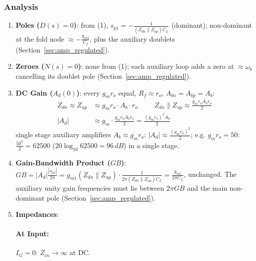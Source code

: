 \subsubsection{Analysis}
\begin{enumerate}
  \item \textbf{Poles (\(D(s) = 0\))}: from (1),
    \(s_{p1} = -\frac{1}{(Z_{dn} \parallel Z_{up}) C_L}\) (dominant); non-dominant at the fold node
    \(\approx -\frac{g_{m3}}{C_f}\), plus the auxiliary doublets (Section~\ref{sec:amp_regulated}).
  \item \textbf{Zeroes (\(N(s) = 0\))}: none from (1); each auxiliary loop adds a zero at
    \(\approx \omega_b\) cancelling its doublet pole (Section~\ref{sec:amp_regulated}).
  \item \textbf{DC Gain (\(A_d(0)\))}: every \(g_m r_o\) equal, \(R_f \approx r_o\), \(A_{bn} = A_{bp} = A_b\):
    \begin{align*}
      Z_{dn} \approx Z_{up} &\approx g_m r_o \cdot A_b \cdot r_o \hspace{1cm}
      Z_{dn} \parallel Z_{up} \approx \frac{g_m r_o A_b r_o}{2} \\
      |A_d| &\approx g_m \cdot \frac{g_m r_o A_b r_o}{2} = \frac{(g_m r_o)^2 A_b}{2}
    \end{align*}
    single stage auxiliary amplifiers \(A_b \approx g_m r_o\): \(|A_d| \approx \frac{(g_m r_o)^3}{2}\); e.g. \(g_m r_o = 50\):
    \(\frac{50^3}{2} = 62500\) (\(20\log_{10} 62500 = 96\,dB\)) in a single stage.
  \item \textbf{Gain-Bandwidth Product (\(GB\))}:
    \(GB = |A_d| \frac{|s_{p1}|}{2\pi} = g_{m1}(Z_{dn} \parallel Z_{up})\cdot\frac{1}{2\pi(Z_{dn} \parallel Z_{up}) C_L} = \frac{g_{m1}}{2\pi C_L}\),
    unchanged. The auxiliary unity gain frequencies must lie between \(2\pi GB\) and the main
    non-dominant pole (Section~\ref{sec:amp_regulated}).
  \item \textbf{Impedances}:
    \paragraph{At Input:} \(I_G = 0\): \(Z_{in} \to \infty\) at DC.

\end{enumerate}
